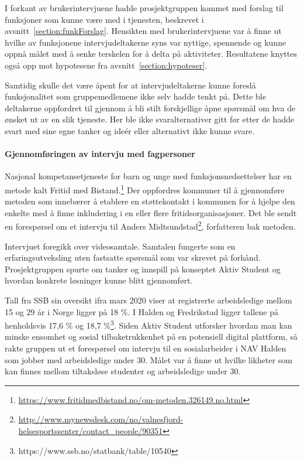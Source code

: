 I forkant av brukerintervjuene hadde prosjektgruppen kommet med forslag til funksjoner som kunne være med i tjenesten, beskrevet i avsnitt~\ref{section:funkForslag}. Hensikten med brukerintervjuene var å finne ut hvilke av funksjonene intervjudeltakerne syns var nyttige, spennende og kunne oppnå målet med å senke terskelen for å delta på aktiviteter. Resultatene knyttes også opp mot hypotesene fra avsnitt~\ref{section:hypoteser}.

Samtidig skulle det være åpent for at intervjudeltakerne kunne foreslå funksjonalitet som gruppemedlemene ikke selv hadde tenkt på. Dette ble deltakerne oppfordret til gjennom å bli stilt forskjellige åpne spørsmål om hva de ønsket ut av en slik tjeneste. Her ble ikke svaralternativer gitt før etter de hadde svart med sine egne tanker og ideér eller alternativt ikke kunne svare.

\paragraph{Gjennomføringen av intervju med fagpersoner}

\vspace{5mm} %
Nasjonal kompetansetjeneste for barn og unge med funksjonsnedsettelser har en metode kalt Fritid med Bistand.\footnote{\url{https://www.fritidmedbistand.no/om-metoden.326149.no.html}} Der oppfordres kommuner til å gjennomføre metoden som innebærer å etablere en støttekontakt i kommunen for å hjelpe den enkelte med å finne inkludering i en eller flere fritidsorganisasjoner. Det ble sendt en forespørsel om et intervju til Anders Midtsundstad\footnote{\url{http://www.mynewsdesk.com/no/valnesfjord-helsesportssenter/contact_people/90351}}, forfatteren bak metoden.
 
 \vspace{5mm} %
Intervjuet foregikk over videosamtale. Samtalen fungerte som en erfaringsutveksling uten fastsatte spørsmål som var skrevet på forhånd. Prosjektgruppen spurte om tanker og innspill på konseptet Aktiv Student og hvordan konkrete løsninger kunne blitt gjennomført.

\vspace{10mm} %


Tall fra SSB sin oversikt ifra mars 2020 viser at registrerte arbeidsledige mellom 15 og 29 år i Norge ligger på 18 \%. I Halden og Fredrikstad ligger tallene på henholdsvis 17,6 \% og 18,7 \%\footnote{https://www.ssb.no/statbank/table/10540}.
Siden Aktiv Student utforsker hvordan man kan minske ensomhet og sosial tilbaketrukkenhet på en potensiell digital plattform, så rakte gruppen ut et forespørsel om intervju til en sosialarbeider i NAV Halden som jobber med arbeidsledige under 30. Målet var å finne ut hvilke likheter som kan finnes mellom tiltaksløse studenter og arbeidsledige under 30.

